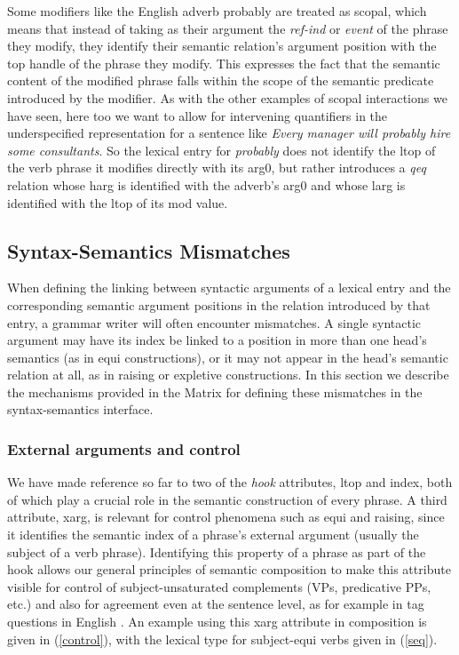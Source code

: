 \documentclass[12pt]{article}
\begin{document}
{Some modifiers like the English adverb {\sc probably} are treated as scopal,
which means that instead of taking as their argument the {\it ref-ind} or
{\it event} of the phrase they modify, they identify their semantic relation's
argument position with the top handle of the phrase they modify.  This
expresses the fact that the semantic content of the modified phrase falls
within the scope of the semantic predicate introduced by the modifier.  As
with the other examples of scopal interactions we have seen, here too we want
to allow for intervening quantifiers in the underspecified representation
for a sentence like {\it Every manager will probably hire some consultants}.
So the lexical entry for {\it probably} does not identify the {\sc ltop} of the
verb phrase it modifies directly with its {\sc arg0}, but rather introduces
a {\it qeq} relation whose {\sc harg} is identified with the adverb's 
{\sc arg0} and whose {\sc larg} is identified with the {\sc ltop} of its
{\sc mod} value.
 
\subsection{Syntax-Semantics Mismatches}
\label{xargsec}

When defining the linking between syntactic arguments of a lexical entry
and the corresponding semantic argument positions in the relation introduced
by that entry, a grammar writer will often encounter mismatches.  A single
syntactic argument may have its index be linked to
a position in more than one head's semantics
(as in equi constructions), or it may not appear in
the head's semantic relation at all, as in raising or expletive constructions.
In this section we describe the mechanisms provided in the Matrix for 
defining these mismatches in the syntax-semantics interface.

\subsubsection{External arguments and control}

We have made reference so far to two of the {\it hook} attributes,
{\sc ltop} and {\sc index}, both of which play a crucial role in the semantic
construction of every phrase.  A third attribute, {\sc xarg}, is relevant for
control phenomena such as equi and raising, since it identifies the semantic
index of a phrase's external argument (usually the subject of a verb phrase).
Identifying this property of a phrase as part of the hook allows our general
principles of semantic composition to make this attribute visible for control
of subject-unsaturated complements (VPs, predicative PPs, etc.) and also for
agreement even at the sentence level, as for example in tag questions in
English \cite{Ben:Fli:99}.  An example using this {\sc xarg}
attribute in composition is given in (\ref{control}), with the lexical type
for subject-equi verbs given in (\ref{seq}).

}
\end{document}
